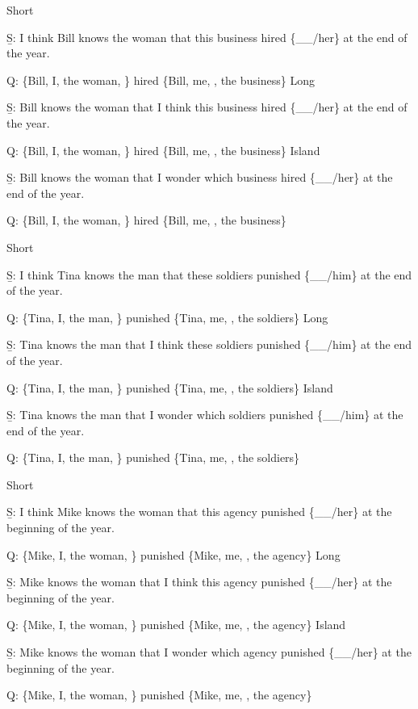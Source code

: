 \pex 
\a Short\par\nobreak
\beginsubsub 
\b{S:} I think Bill knows the woman that this business hired \{\_\_/her\} at the end of the year.\par\nobreak
\b{Q:} \{Bill, I, the woman, \} hired \{Bill, me, , the business\}
\endsubsub
\a Long\par\nobreak
\beginsubsub
\b{S:} Bill knows the woman that I think this business hired \{\_\_/her\} at the end of the year.\par\nobreak
\b{Q:} \{Bill, I, the woman, \} hired \{Bill, me, , the business\}
\endsubsub
\a Island\par\nobreak
\beginsubsub
\b{S:} Bill knows the woman that I wonder which business hired \{\_\_/her\} at the end of the year.\par\nobreak
\b{Q:} \{Bill, I, the woman, \} hired \{Bill, me, , the business\}
\endsubsub
\xe

\pex 
\a Short\par\nobreak
\beginsubsub 
\b{S:} I think Tina knows the man that these soldiers punished \{\_\_/him\} at the end of the year.\par\nobreak
\b{Q:} \{Tina, I, the man, \} punished \{Tina, me, , the soldiers\}
\endsubsub
\a Long\par\nobreak
\beginsubsub
\b{S:} Tina knows the man that I think these soldiers punished \{\_\_/him\} at the end of the year.\par\nobreak
\b{Q:} \{Tina, I, the man, \} punished \{Tina, me, , the soldiers\}
\endsubsub
\a Island\par\nobreak
\beginsubsub
\b{S:} Tina knows the man that I wonder which soldiers punished \{\_\_/him\} at the end of the year.\par\nobreak
\b{Q:} \{Tina, I, the man, \} punished \{Tina, me, , the soldiers\}
\endsubsub
\xe

\pex 
\a Short\par\nobreak
\beginsubsub 
\b{S:} I think Mike knows the woman that this agency punished \{\_\_/her\} at the beginning of the year.\par\nobreak
\b{Q:} \{Mike, I, the woman, \} punished \{Mike, me, , the agency\}
\endsubsub
\a Long\par\nobreak
\beginsubsub
\b{S:} Mike knows the woman that I think this agency punished \{\_\_/her\} at the beginning of the year.\par\nobreak
\b{Q:} \{Mike, I, the woman, \} punished \{Mike, me, , the agency\}
\endsubsub
\a Island\par\nobreak
\beginsubsub
\b{S:} Mike knows the woman that I wonder which agency punished \{\_\_/her\} at the beginning of the year.\par\nobreak
\b{Q:} \{Mike, I, the woman, \} punished \{Mike, me, , the agency\}
\endsubsub
\xe


